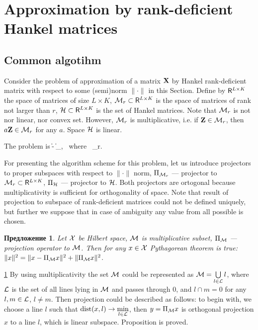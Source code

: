 \documentclass[12pt,a4paper,fleqn,leqno]{article}
\newtheorem{proposition}{Предложение}
\begin{document}
\section{Approximation by rank-deficient Hankel matrices}
\label{sec:lowrank_appr}
\subsection{Common algotihm}
Consider the problem of approximation of a matrix $\mathbf{X}$ by Hankel rank-deficient matrix with respect to some (semi)norm $\|\cdot\|$ in this Section. Define by $\mathsf{R}^{L\times K}$ the space of matrices of size $L \times K$, $\mathcal{M}_r\subset \mathsf{R}^{L\times K}$ is the space of matrices of rank not larger than $r$,
$\mathcal{H} \subset \mathsf{R}^{L\times K}$ is the set of Hankel matrices.
Note that  $\mathcal{M}_r$ is not nor linear, nor convex set. However, $\mathcal{M}_r$ is multiplicative, i.e.
if $\mathbf{Z}\in \mathcal{M}_r$, then $a\mathbf{Z}\in \mathcal{M}_r$ for any $a$.
Space $\mathcal{H}$ is linear.

The problem is
\be
\label{eq:gen_task}
\|\bfX - \bfY\| \to \min_\bfY, \mbox{\ where\ } \bfY \in \calH \cap \calM_r.
\ee

For presenting the algorithm scheme for this problem, let us introduce projectors to proper subspaces with respect to $\|\cdot\|$ norm, $\Pi_{\mathcal{M}_r}$ --- projector to $\mathcal{M}_r\subset \mathsf{R}^{L\times K}$,
$\Pi_{\mathcal{H}}$ --- projector to $\mathcal{H}$.
Both projectors are ortogonal because multiplicativity is sufficient for  orthogonality of space. Note that result of projection to subspace of rank-deficient matrices could not be defined uniquely, but further we suppose that in case of ambiguity any value from all possible is chosen.

\begin{proposition} \label{pythaprop}
Let $\mathcal{X}$ be Hilbert space, $\mathcal{M}$ is multiplicative subset, $\Pi_{\mathcal{M}}$ --- projection operator to $\mathcal{M}$. Then for any $x \in \mathcal{X}$ Pythagorean theorem is true: $\|x\|^2 = \|x - \Pi_{\mathcal{M}} x\|^2 + \|\Pi_{\mathcal{M}} x\|^2$.
\end{proposition}
\begin{proof5}{\ref{pythaprop}}
By using multiplicativity the set $\mathcal{M}$ could be represented as $\mathcal{M} = \bigcup\limits_{l \in \mathcal{L}}l$, where $\mathcal{L}$ is the set of all lines lying in $\mathcal{M}$ and passes through $0$, and $l \cap m = 0$ for any $l, m \in \mathcal{L}$, $l \neq m$. Then projection could be described as follows: to begin with, we choose a line $l$ such that $\mathop{\mathrm{dist}}(x, l) \rightarrow \min\limits_{l \in \mathcal{L}}$, then $y = \Pi_{\mathcal{M}} x$ is orthogonal projection $x$ to a line $l$, which is linear subspace. Proposition is proved.
\end{proof5}
\end{document}

